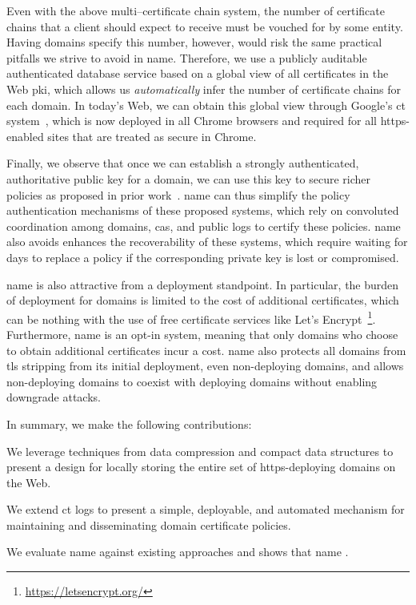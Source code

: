 Even with the above multi--certificate chain system, the number of certificate
chains that a client should expect to receive must be vouched for by some
entity. Having domains specify this number, however, would risk the same
practical pitfalls we strive to avoid in \ac{name}. Therefore, we use a publicly
auditable authenticated database service based on a global view of all
certificates in the Web \ac{pki}, which allows us \emph{automatically} infer the
number of certificate chains for each domain. In today's Web, we can obtain this
global view through Google's \ac{ct} system~\cite{rfc6962}, which is now
deployed in all Chrome browsers and required for all \ac{https}-enabled sites
that are treated as secure in Chrome.

Finally, we observe that once we can establish a strongly authenticated,
authoritative public key for a domain, we can use this key to secure richer
policies as proposed in prior work~\cite{basin2014arpki,
szalachowski2014policert}. \ac{name} can thus simplify the policy authentication
mechanisms of these proposed systems, which rely on convoluted coordination
among domains, \acp{ca}, and public logs to certify these policies. \ac{name}
also avoids enhances the recoverability of these systems, which require waiting
for days to replace a policy if the corresponding private key is lost or
compromised.

\ac{name} is also attractive from a deployment standpoint. In particular, the
burden of deployment for domains is limited to the cost of additional
certificates, which can be nothing with the use of free certificate services
like Let's Encrypt~\footnote{\url{https://letsencrypt.org/}}. Furthermore,
\ac{name} is an opt-in system, meaning that only domains who choose to obtain
additional certificates incur a cost. \ac{name} also protects all domains from
\ac{tls} stripping from its initial deployment, even non-deploying domains, and
allows non-deploying domains to coexist with deploying domains without enabling
downgrade attacks.

In summary, we make the following contributions:
\begin{compactitem}
\item We leverage techniques from data compression and compact data structures
  to present a design for locally storing the entire set of \ac{https}-deploying
  domains on the Web.
\item We extend \ac{ct} logs to present a simple, deployable, and automated
  mechanism for maintaining and disseminating domain certificate policies.
\item We evaluate \ac{name} against existing approaches and shows that
  \ac{name} .
\end{compactitem}


